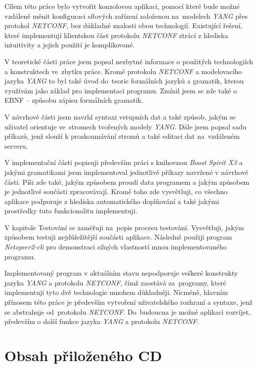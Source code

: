 \documentclass[thesis=B,czech,hidelinks]{FITthesis}[2019/03/06]
\begin{document}
\begin{conclusion}
Cílem této práce bylo vytvořit konzolovou aplikaci, pomocí které bude možné vzdáleně měnit konfiguraci síťových zařízení založenou na~modelech \textit{YANG} přes protokol \textit{NETCONF}, bez důkladné znalosti obou technologií. Existující řešení, které implementují klientskou část protokolu \textit{NETCONF} ztrácí z hlediska intuitivity a jejich použití je komplikované.

V teoretické části práce jsem popsal nezbytné informace o použitých technologiích a konstruktech ve~zbytku práce. Kromě protokolu \textit{NETCONF} a modelovacího jazyka \textit{YANG} to byl také úvod do~teorie formálních jazyků a gramatik, kterou využívám jako základ pro implementaci programu. Zmínil jsem se zde také o EBNF -- způsobu zápisu formálních gramatik.

V návrhové části jsem navrhl syntaxi vstupních dat a také způsob, jakým se uživatel orientuje ve~stromech tvořených modely \textit{YANG}. Dále jsem popsal sadu příkazů, jenž slouží k prozkoumávání stromů a také editaci dat na~vzdáleném serveru.

V implementační části popisuji především práci s knihovnou \textit{Boost Spirit X3} a jakými gramatikami jsem implementoval jednotlivé příkazy navržené v návrhové části. Píši zde také, jakým způsobem proudí data programem a  jakým způsobem je jednotlivé součásti zpracovávají. Kromě toho zde vysvětluji, co všechno aplikace podporuje z hlediska automatického doplňování a také jakými prostředky tuto funkcionalitu implementuji.

V kapitole Testování se zaměřuji na~popis procesu testování. Vysvětluji, jakým způsobem testuji nejdůležitější součásti aplikace. Následně použiji program \textit{Netopeer2-cli} pro demonstraci silných vlastností mnou implementovaného programu.

Implementovaný program v aktuálním stavu nepodporuje veškeré konstrukty jazyka \textit{YANG} a protokolu \textit{NETCONF}, čímž zaostává za~programy, které implementují tyto dvě technologie mnohem důkladněji. Nicméně, hlavním přínosem této práce je především vytvoření uživatelského rozhraní a syntaxe, jenž se abstrahuje od~protokolu \textit{NETCONF}. Do~budoucna je možné aplikaci rozvíjet, především o další funkce jazyka \textit{YANG} a protokolu \textit{NETCONF}.
\end{conclusion}

\printbibliography{}

\appendix

\chapter{Obsah přiloženého CD}

\end{document}
